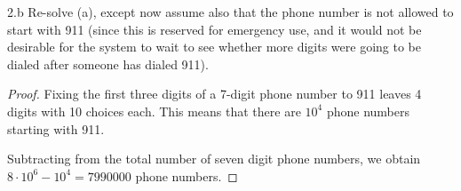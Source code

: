 \begin{exercise}{2.b}
    Re-solve (a), except now assume also that the phone number is not allowed to start with 911 (since this is reserved for emergency use, and it would not be desirable for the system to wait to see whether more digits were going to be dialed after someone has dialed 911).
\end{exercise}

\begin{proof}
    Fixing the first three digits of a 7-digit phone number to 911 leaves 4 digits with 10 choices each. This means that there are $10^4$ phone numbers starting with 911.

    Subtracting from the total number of seven digit phone numbers, we obtain $8 \cdot 10^6 - 10^4 = 7990000$ phone numbers.
\end{proof}

